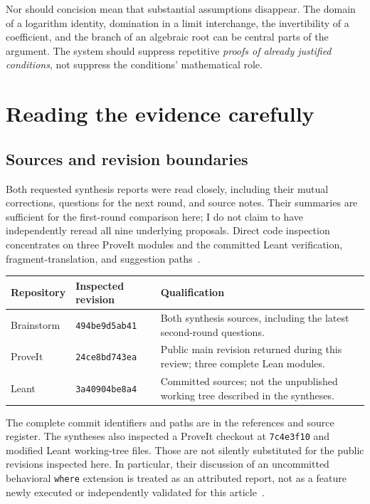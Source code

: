 \documentclass[11pt,a4paper]{article}
\newcommand{\code}[1]{\nolinkurl{#1}}
\theoremstyle{definition}
\begin{document}
Nor should concision mean that substantial assumptions disappear. The domain of a logarithm identity, domination in a limit interchange, the invertibility of a coefficient, and the branch of an algebraic root can be central parts of the argument. The system should suppress repetitive \emph{proofs of already justified conditions}, not suppress the conditions' mathematical role.

\section{Reading the evidence carefully}\label{sec:evidence}

\subsection{Sources and revision boundaries}
Both requested synthesis reports were read closely, including their mutual corrections, questions for the next round, and source notes. Their summaries are sufficient for the first-round comparison here; I do not claim to have independently reread all nine underlying proposals. Direct code inspection concentrates on three ProveIt modules and the committed Leant verification, fragment-translation, and suggestion paths~\cite{synA,synB,pbin,pode,pabel,lverify,lfragment,lmain}.

\begin{tabularx}{\textwidth}{@{}lP{.27\textwidth}Y@{}}
\toprule
Repository & Inspected revision & Qualification\\
\midrule
Brainstorm & \code{494be9d5ab41} & Both synthesis sources, including the latest second-round questions.\\
ProveIt & \code{24ce8bd743ea} & Public main revision returned during this review; three complete Lean modules.\\
Leant & \code{3a40904be8a4} & Committed sources; not the unpublished working tree described in the syntheses.\\
\bottomrule
\end{tabularx}

The complete commit identifiers and paths are in the references and source register. The syntheses also inspected a ProveIt checkout at \code{7c4e3f10} and modified Leant working-tree files. Those are not silently substituted for the public revisions inspected here. In particular, their discussion of an uncommitted behavioral \code{where} extension is treated as an attributed report, not as a feature newly executed or independently validated for this article~\cite{synA,synB}.
\end{document}
